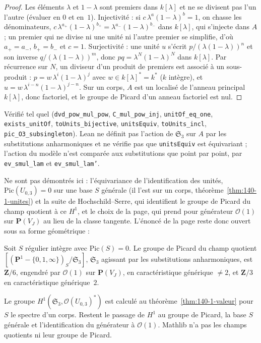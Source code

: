 \begin{proof}
Les éléments $\lambda$ et $1 - \lambda$ sont premiers dans $k[\lambda]$ et ne se divisent pas l'un l'autre (évaluer en $0$ et en~$1$). Injectivité : si $c\,\lambda^a(1-\lambda)^b = 1$, on chasse les dénominateurs, $c\,\lambda^{a_+}(1-\lambda)^{b_+} = \lambda^{a_-}(1-\lambda)^{b_-}$ dans $k[\lambda]$, qui s'injecte dans $A$ ; un premier qui ne divise ni une unité ni l'autre premier se simplifie, d'où $a_+ = a_-$, $b_+ = b_-$ et $c = 1$. Surjectivité : une unité $u$ s'écrit $p/(\lambda(1-\lambda))^n$ et son inverse $q/(\lambda(1-\lambda))^m$, donc $pq = \lambda^N(1-\lambda)^N$ dans $k[\lambda]$. Par récurrence sur $N$, un diviseur d'un produit de premiers est associé à un sous-produit : $p = w\,\lambda^i(1-\lambda)^j$ avec $w \in k[\lambda]^* = k^*$ ($k$ intègre), et $u = w\,\lambda^{i-n}(1-\lambda)^{j-n}$. Sur un corps, $A$ est un localisé de l'anneau principal $k[\lambda]$, donc factoriel, et le groupe de Picard d'un anneau factoriel est nul.
\end{proof}

\noindent Vérifié tel quel (\texttt{dvd\_pow\_mul\_pow}, \texttt{C\_mul\_pow\_inj}, \texttt{unitOf\_eq\_one}, \texttt{exists\_unitOf}, \texttt{toUnits\_bijective}, \texttt{unitsEquiv}, \texttt{toUnits\_incl}, \texttt{pic\_O3\_subsingleton}). Lean ne définit pas l'action de $\mathfrak S_3$ sur $A$ par les substitutions anharmoniques et ne vérifie pas que \texttt{unitsEquiv} est équivariant ; l'action du modèle n'est comparée aux substitutions que point par point, par \texttt{ev\_smul\_lam} et \texttt{ev\_smul\_lam'}.

Ne sont pas démontrés ici : l'équivariance de l'identification des unités, $\mathrm{Pic}(U_{0,3}) = 0$ sur une base $S$ générale (il l'est sur un corps, théorème~\ref{thm:140-1-unites}) et la suite de Hochschild--Serre, qui identifient le groupe de Picard du champ quotient à ce $H^1$, et le choix de la page, qui prend pour générateur $\mathcal O(1)$ sur $\mathbf P(V_J)$ au lieu de la classe tangente. L'énoncé de la page reste donc ouvert sous sa forme géométrique :

\begin{encadre}
\begin{theoreme*}\nonverifie
Soit $S$ régulier intègre avec $\mathrm{Pic}(S) = 0$. Le groupe de Picard du champ quotient $[(\mathbf P^1 - \{0, 1, \infty\})_S/\mathfrak S_3]$, $\mathfrak S_3$ agissant par les substitutions anharmoniques, est $\mathbf Z/6$, engendré par $\mathcal O(1)$ sur $\mathbf P(V_J)$, en caractéristique générique $\neq 2$, et $\mathbf Z/3$ en caractéristique générique~$2$.
\end{theoreme*}
\end{encadre}
{\small Le groupe $H^1(\mathfrak S_3, \mathcal O(U_{0,3})^*)$ est calculé au théorème~\ref{thm:140-1-valeur} pour $S$ le spectre d'un corps. Restent le passage de $H^1$ au groupe de Picard, la base $S$ générale et l'identification du générateur à $\mathcal O(1)$. Mathlib n'a pas les champs quotients ni leur groupe de Picard.\par}

